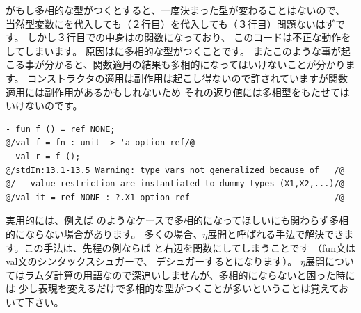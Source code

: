 \documentclass[11pt,a4paper]{jarticle}
\begin{document}
がもし多相的な型がつくとすると、一度決まった型が変わることはないので、
当然型変数にを代入しても（２行目）を代入しても（３行目）問題ないはずです。
しかし３行目での中身はの関数になっており、
このコードは不正な動作をしてしまいます。
原因はに多相的な型がつくことです。
またこのような事が起こる事が分かると、関数適用の結果も多相的になってはいけないことが分かります。
コンストラクタの適用は副作用は起こし得ないので許されていますが関数適用には副作用があるかもしれないため
それの返り値には多相型をもたせてはいけないのです。

\begin{lstlisting}[caption=関数の例,label=code:value-restricted-function]
- fun f () = ref NONE;
@/val f = fn : unit -> 'a option ref/@
- val r = f ();
@/stdIn:13.1-13.5 Warning: type vars not generalized because of   /@
@/   value restriction are instantiated to dummy types (X1,X2,...)/@
@/val it = ref NONE : ?.X1 option ref                             /@
\end{lstlisting}

実用的には、例えば
のようなケースで多相的になってほしいにも関わらず多相的にならない場合があります。
多くの場合、$\eta$展開と呼ばれる手法で解決できます。この手法は、先程の例ならば
と右辺を関数にしてしまうことです
（fun文はval文のシンタックスシュガーで、
デシュガーするとになります）。
$\eta$展開についてはラムダ計算の用語なので深追いしませんが、多相的にならないと困った時には
少し表現を変えるだけで多相的な型がつくことが多いということは覚えておいて下さい。
\end{document}
